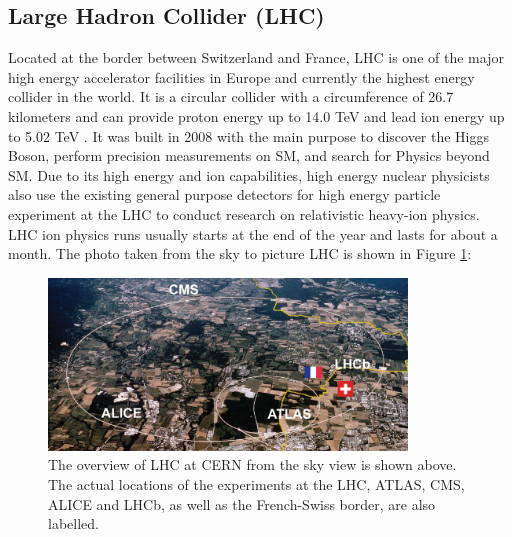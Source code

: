 
\subsection{Large Hadron Collider (LHC)} 

Located at the border between Switzerland and France, LHC is one of the major high energy accelerator facilities in Europe and currently the highest energy collider in the world. It is a circular collider with a circumference of 26.7 kilometers and can provide proton energy up to 14.0 TeV and lead ion energy up to 5.02 TeV \cite{LHCReport}. It was built in 2008 with the main purpose to discover the Higgs Boson, perform precision measurements on SM, and search for Physics beyond SM. Due to its high energy and ion capabilities, high energy nuclear physicists also use the existing general purpose detectors for high energy particle experiment at the LHC to conduct research on relativistic heavy-ion physics. LHC ion physics runs usually starts at the end of the year and lasts for about a month. The photo taken from the sky to picture LHC is shown in Figure \ref{LHC}:

\begin{figure}[hbtp]
\begin{center}
\includegraphics[width=0.85\textwidth]{Figures/Chapter1/LHC.png}
\caption{The overview of LHC at CERN from the sky view is shown above. The actual locations of the experiments at the LHC, ATLAS, CMS, ALICE and LHCb, as well as the French-Swiss border, are also labelled.}
\label{LHC}
\end{center}
\end{figure} 

